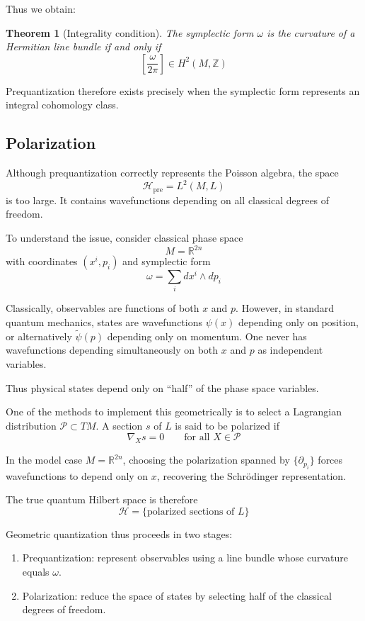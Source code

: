 \documentclass[
  12pt,
  a4paper, oneside
]{report}
\theoremstyle{bolddef}
\newtheorem{theorem}{Theorem}[chapter]
\theoremstyle{remark}
\numberwithin{equation}{chapter}
\begin{document}
Thus we obtain:

\medskip

\begin{theorem}[Integrality condition]
The symplectic form $\omega$
is the curvature of a Hermitian line bundle
if and only if
$$
\left[\frac{\omega}{2\pi}\right]
\in H^2(M,\mathbb Z)
$$
\end{theorem}

\medskip

Prequantization therefore exists precisely
when the symplectic form represents
an integral cohomology class.
\subsection{Polarization}\label{subsec:polarization}

Although prequantization correctly represents the Poisson algebra,
the space
$$
\mathcal H_{\mathrm{pre}} = L^2(M,L)
$$
is too large. It contains wavefunctions depending on all classical
degrees of freedom.

To understand the issue, consider classical phase space
$$
M=\mathbb R^{2n}
$$
with coordinates $(x^i,p_i)$ and symplectic form
$$
\omega = \sum_i dx^i \wedge dp_i
$$

Classically, observables are functions of both $x$ and $p$.
However, in standard quantum mechanics,
states are wavefunctions $\psi(x)$ depending only on position,
or alternatively $\tilde\psi(p)$ depending only on momentum.
One never has wavefunctions depending simultaneously
on both $x$ and $p$ as independent variables.

Thus physical states depend only on “half” of the phase space variables.

One of the methods to implement this geometrically is to select a Lagrangian distribution $\mathcal{P} \subset TM$. A section $s$ of $L$ is said to be polarized\cite{Woodhouse1997} if
$$
\nabla_X s = 0
\qquad
\text{for all } X\in\mathcal P
$$

In the model case $M=\mathbb R^{2n}$,
choosing the polarization spanned by
$\{\partial_{p_i}\}$
forces wavefunctions to depend only on $x$,
recovering the Schrödinger representation.

The true quantum Hilbert space is therefore
$$
\mathcal H
=
\{ \text{polarized sections of } L \}
$$

Geometric quantization thus proceeds in two stages:

\begin{enumerate}
\item Prequantization: represent observables using a line bundle
      whose curvature equals $\omega$.
\item Polarization: reduce the space of states by selecting
      half of the classical degrees of freedom.
\end{enumerate}
\end{document}
